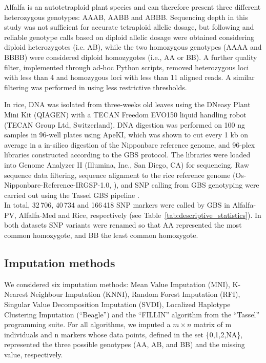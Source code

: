 Alfalfa is an autotetraploid plant species and can therefore present three different heterozygous genotypes: AAAB, AABB and ABBB. Sequencing depth in this study was not sufficient for accurate tetraploid allelic dosage, but following \cite{li_saturated_2014} and \cite{li_genomic_2015} reliable genotype calls based on diploid allelic dosage were obtained considering diploid heterozygotes (i.e. AB), while the two homozygous genotypes (AAAA and BBBB) were considered diploid homozygotes (i.e., AA or BB). A further quality filter, implemented through ad-hoc Python scripts, removed heterozygous loci with less than 4 and homozygous loci with less than 11 aligned reads. A similar filtering was performed in \cite{Rocher_validation_2015} using less restrictive thresholds. 

In rice, DNA was isolated from three-weeks old leaves using the DNeasy Plant Mini Kit (QIAGEN) with a TECAN Freedom EVO150 liquid handling robot (TECAN Group Ltd, Switzerland). DNA digestion was performed on 100 ng samples in 96-well plates using ApeKI, which was shown to cut every 1 kb on average in a in-silico digestion of the Nipponbare reference genome, and 96-plex libraries constructed according to the GBS protocol. The libraries were loaded into Genome Analyzer II (Illumina, Inc., San Diego, CA) for sequencing. Raw sequence data filtering, sequence alignment to the rice reference genome (Os-Nipponbare-Reference-IRGSP-1.0, \cite{kawahara_improvement_2013}), and SNP calling from GBS genotyping were carried out using the Tassel GBS pipeline \cite{glaubitz_tassel-gbs:_2014}.\\
In total, 32\,706, 40\,734 and 166\,418 SNP markers were called by GBS in Alfalfa-PV, Alfalfa-Med and Rice, respectively (see Table~\ref{tab:descriptive_statistics}). In both datasets SNP variants were renamed so that AA represented the most common homozygote, and BB the least common homozygote.



\subsection{Imputation methods}
\label{sec:imputation_methods}
We considered six imputation methods: Mean Value Imputation (MNI), K-Nearest Neighbour Imputation (KNNI), Random Forest Imputation (RFI), Singular Value Decomposition Imputation (SVDI), Localized Haplotype Clustering Imputation (``Beagle'') and the ``FILLIN'' algorithm from the ``Tassel'' programming suite. For all algorithms, we imputed a $m\times n$ matrix of m individuals and n markers whose data points, defined in the set \{0,1,2,NA\}, represented the three possible genotypes (AA, AB, and BB) and the missing value, respectively. 
